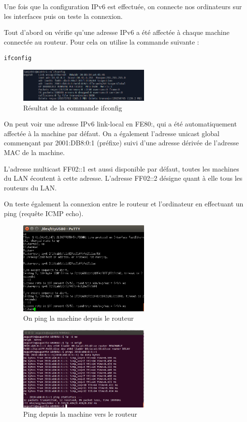         Une fois que la configuration IPv6 est effectuée, on connecte nos ordinateurs sur les interfaces puis on teste la connexion.
        
        Tout d'abord on vérifie qu'une adresse IPv6 a été affectée à chaque machine connectée au routeur.
Pour cela on utilise la commande suivante :

        \begin{lstlisting}[frame=single]
			ifconfig
        \end{lstlisting}
        
        \begin{figure}[h]
        \includegraphics[width=250px]{figures/ipv6-adr.png}
        \centering
        \caption{Résultat de la commande ifconfig}
        \end{figure}
        
        On peut voir une adresse IPv6 link-local en FE80:, qui a été automatiquement affectée à la machine par défaut.
        On a également l'adresse unicast global commençant par 2001:DB8:0:1 (préfixe) suivi d'une adresse dérivée de l'adresse MAC de la machine.
        
        L'adresse multicast FF02::1 est aussi disponible par défaut, toutes les machines du LAN écoutent à cette adresse.
        L'adresse FF02::2 désigne quant à elle tous les routeurs du LAN.
        
         On teste également la connexion entre le routeur et l'ordinateur en effectuant un ping (requête ICMP echo).
            \begin{figure}[h]
            \includegraphics[width=250px]{figures/pings2.png}
            \centering
            \caption{On ping la machine depuis le routeur}
            \end{figure}

            \begin{figure}[h]
            \includegraphics[width=250px]{figures/pings.png}
            \centering
            \caption{Ping depuis la machine vers le routeur}
            \end{figure}
        
